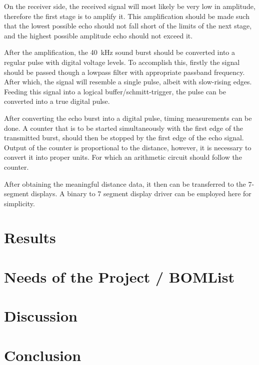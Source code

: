 \documentclass[12pt, a4paper]{article}
\begin{document}
    \bigskip
    On the receiver side, the received signal will most likely be very low in amplitude, therefore the first stage is to amplify it. This amplification should be made such that the lowest possible echo should not fall short of the limits of the next stage, and the highest possible amplitude echo should not exceed it.
    
    \bigskip
    After the amplification, the \SI{40}{\kilo\hertz} sound burst should be converted into a regular pulse with digital voltage levels. To accomplish this, firstly the signal should be passed though a lowpass filter with appropriate passband frequency. After which, the signal will resemble a single pulse, albeit with slow-rising edges. Feeding this signal into a logical buffer/schmitt-trigger, the pulse can be converted into a true digital pulse. 

    \bigskip
    After converting the echo burst into a digital pulse, timing measurements can be done. A counter that is to be started simultaneously with the first edge of the transmitted burst, should then be stopped by the first edge of the echo signal. Output of the counter is proportional to the distance, however, it is necessary to convert it into proper units. For which an arithmetic circuit should follow the counter.

    \bigskip
    After obtaining the meaningful distance data, it then can be transferred to the 7-segment displays. A binary to 7 segment display driver can be employed here for simplicity.


    \pagebreak

    \section{Results}
    
    
        \pagebreak
            
    \section{Needs of the Project / BOMList}

      
    \pagebreak
     \section{Discussion}
     
      \pagebreak
     \section{Conclusion}
     
\end{document}

